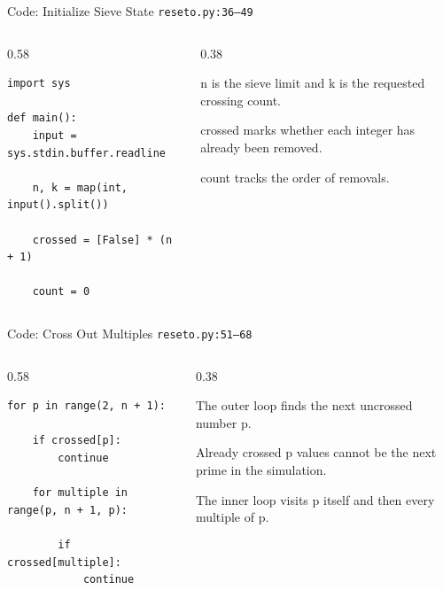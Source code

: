 \documentclass[aspectratio=169,11pt]{beamer}
\begin{document}
\begin{frame}[fragile]{Code: Initialize Sieve State}
\scriptsize
{} \texttt{reseto.py:36--49}

\vspace{0.08cm}
\begin{columns}[T,totalwidth=\textwidth]
\begin{column}{0.58\textwidth}
\begin{lstlisting}[style=cpcode]
import sys

def main():
    input = sys.stdin.buffer.readline

    n, k = map(int, input().split())

    crossed = [False] * (n + 1)

    count = 0
\end{lstlisting}
\end{column}
\begin{column}{0.38\textwidth}
\begin{tightitemize}
  \item n is the sieve limit and k is the requested crossing count.
  \item crossed marks whether each integer has already been removed.
  \item count tracks the order of removals.
\end{tightitemize}
\end{column}
\end{columns}
\end{frame}

\begin{frame}[fragile]{Code: Cross Out Multiples}
\scriptsize
{} \texttt{reseto.py:51--68}

\vspace{0.08cm}
\begin{columns}[T,totalwidth=\textwidth]
\begin{column}{0.58\textwidth}
\begin{lstlisting}[style=cpcode]
for p in range(2, n + 1):

    if crossed[p]:
        continue

    for multiple in range(p, n + 1, p):

        if crossed[multiple]:
            continue
\end{lstlisting}
\end{column}
\begin{column}{0.38\textwidth}
\begin{tightitemize}
  \item The outer loop finds the next uncrossed number p.
  \item Already crossed p values cannot be the next prime in the simulation.
  \item The inner loop visits p itself and then every multiple of p.
\end{tightitemize}
\end{column}
\end{columns}
\end{frame}
\end{document}
